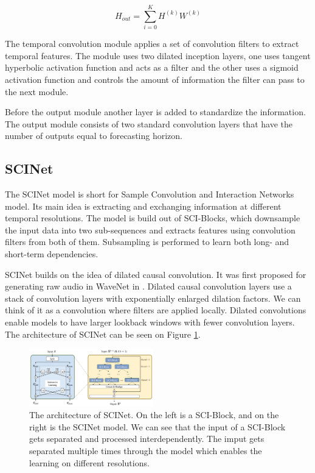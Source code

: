 \documentclass[conference]{IEEEtran}
\begin{document}
\begin{equation}
\label{eq:infosel}
    H_{out} = \sum_{i=0}^{K}H^{(k)}W^{(k)}
\end{equation}

The temporal convolution module applies a set of convolution filters to extract temporal features.
The module uses two dilated inception layers, one uses tangent hyperbolic activation function and acts as a filter and the other uses a sigmoid activation function and controls the amount of information the filter can pass to the next module.

Before the output module another layer is added to standardize the information.
The output module consists of two standard convolution layers that have the number of outputs equal to forecasting horizon.

\subsection{\textbf{SCINet}}

The SCINet model is short for Sample Convolution and Interaction Networks model.
Its main idea is extracting and exchanging information at different temporal resolutions.
The model is build out of SCI-Blocks, which downsample the input data into two sub-sequences and extracts features using convolution filters from both of them.
Subsampling is performed to learn both long- and short-term dependencies.

SCINet builds on the idea of dilated causal convolution.
It was first proposed for generating raw audio in WaveNet in \cite{oord2016wavenet}.
Dilated causal convolution layers use a stack of convolution layers with exponentially enlarged dilation factors.
We can think of it as a convolution where filters are applied locally.
Dilated convolutions enable models to have larger lookback windows with fewer convolution layers.
The architecture of SCINet can be seen on Figure \ref{fig:scinet}.

\begin{figure}[htb]
    \centering
    \includegraphics[width=0.48\textwidth]{scinet.png}
    \caption{The architecture of SCINet. On the left is a SCI-Block, and on the right is the SCINet model. We can see that the input of a SCI-Block gets separated and processed interdependently. The imput gets separated multiple times through the model which enables the learning on different resolutions.}
    \label{fig:scinet}
\end{figure}
\end{document}
